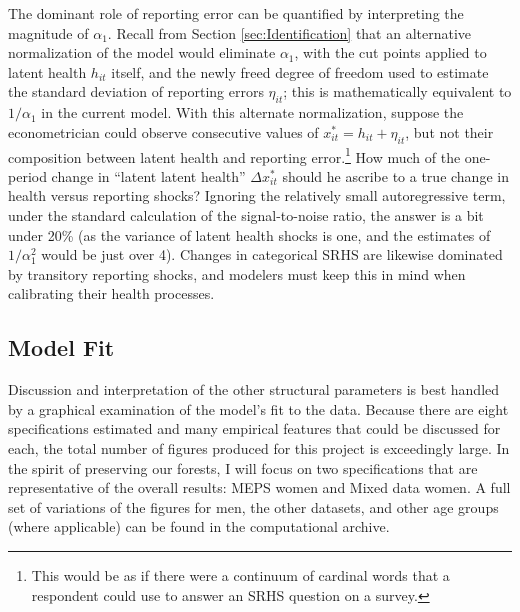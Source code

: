 \documentclass[12pt,pdftex,letterpaper]{article}
\newcommand{\Health}{h}
\newcommand{\Report}{x}
\newcommand{\LatentParam}{\alpha}
\newcommand{\ReportShock}{\eta}
\begin{document}
The dominant role of reporting error can be quantified by interpreting the magnitude of $\LatentParam_1$.  Recall from Section \ref{sec:Identification} that an alternative normalization of the model would eliminate $\LatentParam_1$, with the cut points applied to latent health $\Health_{it}$ itself, and the newly freed degree of freedom used to estimate the standard deviation of reporting errors $\ReportShock_{it}$; this is mathematically equivalent to $1/\LatentParam_1$ in the current model.  With this alternate normalization, suppose the econometrician could observe consecutive values of $\Report_{it}^* = \Health_{it} + \ReportShock_{it}$, but not their composition between latent health and reporting error.\footnote{This would be as if there were a continuum of cardinal words that a respondent could use to answer an SRHS question on a survey.}  How much of the one-period change in ``latent latent health'' $\Delta \Report_{it}^*$ should he ascribe to a true change in health versus reporting shocks?  Ignoring the relatively small autoregressive term, under the standard calculation of the signal-to-noise ratio, the answer is a bit under 20\% (as the variance of latent health shocks is one, and the estimates of $1/\LatentParam_1^2$ would be just over 4).  Changes in categorical SRHS are likewise dominated by transitory reporting shocks, and modelers must keep this in mind when calibrating their health processes.


\subsection{Model Fit}\label{sec:Fit}

Discussion and interpretation of the other structural parameters is best handled by a graphical examination of the model's fit to the data.  Because there are eight specifications estimated and many empirical features that could be discussed for each, the total number of figures produced for this project is exceedingly large.  In the spirit of preserving our forests, I will focus on two specifications that are representative of the overall results: MEPS women and Mixed data women.  A full set of variations of the figures for men, the other datasets, and other age groups (where applicable) can be found in the computational archive.
\end{document}
